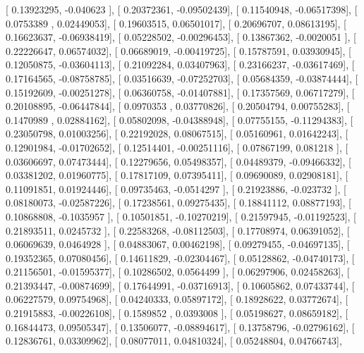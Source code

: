 \documentclass{article}
\begin{document}
       [ 0.13923295, -0.040623  ],
       [ 0.20372361, -0.09502439],
       [ 0.11540948, -0.06517398],
       [ 0.0753389 ,  0.02449053],
       [ 0.19603515,  0.06501017],
       [ 0.20696707,  0.08613195],
       [ 0.16623637, -0.06938419],
       [ 0.05228502, -0.00296453],
       [ 0.13867362, -0.0020051 ],
       [ 0.22226647,  0.06574032],
       [ 0.06689019, -0.00419725],
       [ 0.15787591,  0.03930945],
       [ 0.12050875, -0.03604113],
       [ 0.21092284,  0.03407963],
       [ 0.23166237, -0.03617469],
       [ 0.17164565, -0.08758785],
       [ 0.03516639, -0.07252703],
       [ 0.05684359, -0.03874444],
       [ 0.15192609, -0.00251278],
       [ 0.06360758, -0.01407881],
       [ 0.17357569,  0.06717279],
       [ 0.20108895, -0.06447844],
       [ 0.0970353 ,  0.03770826],
       [ 0.20504794,  0.00755283],
       [ 0.1470989 ,  0.02884162],
       [ 0.05802098, -0.04388948],
       [ 0.07755155, -0.11294383],
       [ 0.23050798,  0.01003256],
       [ 0.22192028,  0.08067515],
       [ 0.05160961,  0.01642243],
       [ 0.12901984, -0.01702652],
       [ 0.12514401, -0.00251116],
       [ 0.07867199,  0.081218  ],
       [ 0.03606697,  0.07473444],
       [ 0.12279656,  0.05498357],
       [ 0.04489379, -0.09466332],
       [ 0.03381202,  0.01960775],
       [ 0.17817109,  0.07395411],
       [ 0.09690089,  0.02908181],
       [ 0.11091851,  0.01924446],
       [ 0.09735463, -0.0514297 ],
       [ 0.21923886, -0.023732  ],
       [ 0.08180073, -0.02587226],
       [ 0.17238561,  0.09275435],
       [ 0.18841112,  0.08877193],
       [ 0.10868808, -0.1035957 ],
       [ 0.10501851, -0.10270219],
       [ 0.21597945, -0.01192523],
       [ 0.21893511,  0.0245732 ],
       [ 0.22583268, -0.08112503],
       [ 0.17708974,  0.06391052],
       [ 0.06069639,  0.0464928 ],
       [ 0.04883067,  0.00462198],
       [ 0.09279455, -0.04697135],
       [ 0.19352365,  0.07080456],
       [ 0.14611829, -0.02304467],
       [ 0.05128862, -0.04740173],
       [ 0.21156501, -0.01595377],
       [ 0.10286502,  0.0564499 ],
       [ 0.06297906,  0.02458263],
       [ 0.21393447, -0.00874699],
       [ 0.17644991, -0.03716913],
       [ 0.10605862,  0.07433744],
       [ 0.06227579,  0.09754968],
       [ 0.04240333,  0.05897172],
       [ 0.18928622,  0.03772674],
       [ 0.21915883, -0.00226108],
       [ 0.1589852 ,  0.0393008 ],
       [ 0.05198627,  0.08659182],
       [ 0.16844473,  0.09505347],
       [ 0.13506077, -0.08894617],
       [ 0.13758796, -0.02796162],
       [ 0.12836761,  0.03309962],
       [ 0.08077011,  0.04810324],
       [ 0.05248804,  0.04766743],
\end{document}
